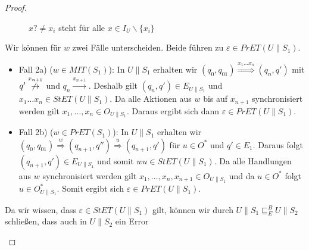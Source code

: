 \begin{proof}
\begin{itemize}
\begin{figure} [h!tbp]
\begin{center}
        \caption{$x?\neq x_i$ steht für alle $x\in I_U\backslash\{x_i\}$}
        \label{UohneE}
      \end{center}
      \end{figure}
      Wir können für $w$ zwei Fälle unterscheiden. Beide führen zu
      $\varepsilon\in PrET(U\|S_1)$.
      \begin{itemize}
        \item Fall 2a) ($w\in MIT(S_1)$): In $U\|S_1$ erhalten wir
          $(q_0,q_{01}) \overset{x_1\dots x_n}{\Rightarrow} (q_n,q')$ mit
          $q' \overset{x_{n+1}}{\not{\hspace{-0.1cm}\rightarrow}}$ und $q_n
          \overset{x_{n+1}}{\rightarrow}$. Deshalb gilt $(q_n,q')\in
          E_{U\|S_1}$ und $x_1\dots x_n\in StET(U\|S_1)$. Da alle Aktionen aus
          $w$ bis auf $x_{n+1}$ synchronisiert werden gilt $x_1,\dots ,x_n\in
          O_{U\|S_1}$. Daraus ergibt sich dann $\varepsilon\in PrET(U\|S_1)$.
        \item Fall 2b) ($w\in PrET(S_1)$): In $U\|S_1$ erhalten wir
          $(q_0,q_{01}) \overset{w}{\Rightarrow} (q_{n+1},q'')
          \overset{u}{\Rightarrow} (q_{n+1},q')$ für $u\in O^*$ und $q'\in
          E_1$. Daraus folgt $(q_{n+1},q')\in E_{U\|S_1}$ und somit $wu\in
          StET(U\|S_1)$. Da alle Handlungen aus $w$ synchronisiert werden gilt
          $x_1,\dots ,x_n,x_{n+1}\in O_{U\|S_1}$ und da $u\in O^*$ folgt
          $u\in O_{U\|S_1}^*$. Somit ergibt sich $\varepsilon\in
          PrET(U\|S_1)$.
      \end{itemize}
      Da wir wissen, dass $\varepsilon\in StET(U\|S_1)$ gilt, können wir durch
      $U\|S_1\sqsubseteq _E^B U\|S_2$ schließen, dass auch in $U\|S_2$ ein Error

\end{itemize}
\end{proof}
